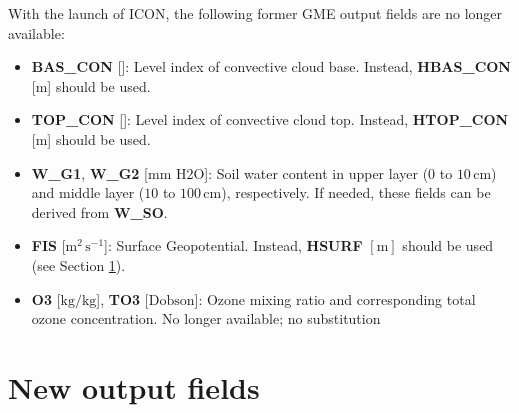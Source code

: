 With the launch of ICON, the following former GME output fields are no longer available:

\begin{itemize}
 \item \textbf{BAS\_CON} [\textendash]: Level index of convective cloud base. Instead, \textbf{HBAS\_CON} [m] should be used.
 \item \textbf{TOP\_CON} [\textendash]: Level index of convective cloud top. Instead, \textbf{HTOP\_CON} [m] should be used.
 \item \textbf{W\_G1}, \textbf{W\_G2}  [mm H2O]: Soil water content in upper layer ($0$ to $10\,\mathrm{cm}$) and middle layer ($10$ to $100\,\mathrm{cm}$), respectively. 
                                                 If needed, these fields can be derived from \textbf{W\_SO}.
 \item \textbf{FIS} [$\mathrm{m^{2}\,s^{-1}}$]: Surface Geopotential. Instead, \textbf{HSURF} $[\mathrm{m}]$ should be used (see Section \ref{sec_newout}).
 \item \textbf{O3} [$\mathrm{kg/kg}$], \textbf{TO3} [$\mathrm{Dobson}$]: Ozone mixing ratio and corresponding total ozone concentration. No longer available; no substitution
\end{itemize}


\section{New output fields}\label{sec_newout}


